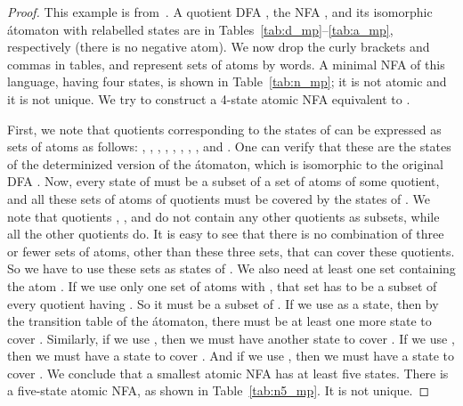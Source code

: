 \documentclass{llncs}
\begin{document}
\begin{proof}
\vskip-0.1cm
This example is from~\cite{MaPo95}. 
A quotient DFA , the NFA , and its isomorphic \'atomaton 
 with relabelled states are  in Tables~\ref{tab:d_mp}--\ref{tab:a_mp}, 
respectively (there is no negative atom). We  now drop the curly brackets and commas in tables, and 
represent sets of atoms by words.
A minimal NFA  of this language, having four states, is shown in 
Table~\ref{tab:n_mp}; it is not atomic and it is not unique. 
We try to construct a 4-state atomic NFA  equivalent to . 

\vskip-0.5cm
\begin{table}[hbt]
\begin{minipage}[b]{0.25\linewidth}
\caption{.}
\label{tab:d_mp}
\begin{center}

\end{center}
\end{minipage}
\hspace{0.05cm}
\begin{minipage}[b]{0.35\linewidth}
\caption{.}
\label{tab:drdr_mp}
\begin{center}

\end{center}
\end{minipage}
\hspace{0.8cm}
\begin{minipage}[b]{0.3\linewidth}
\caption{ .}
\label{tab:a_mp}
\begin{center}

\end{center}
\end{minipage}
\end{table}
\vskip-0.4cm
First, we note that quotients corresponding to the states of  can be expressed 
as sets of atoms as follows:
, , , ,
, , , , and
. One can verify that these are the states of the determinized 
version of the \'atomaton, which is isomorphic to the original DFA . 
Now, every state of  must be a subset of a set of atoms of some quotient, 
and all these sets of atoms of quotients must be covered by the states of .
We note that quotients , , and 
do not contain any other quotients as subsets, while all the other quotients do.
It is easy to see that there is no combination of three or fewer sets of atoms, 
other than these three sets, that can cover these quotients. 
So we have to use these sets as states of . 
We also need at least one set containing the atom . 
If we use only one set of atoms with , that set has to be
a subset of every quotient having . So it must be
a subset of . If we use  as a state, then by the transition 
table of the \'atomaton, there must be at least one more state to cover 
. Similarly, if we use , then we must have another state to cover 
. If we use , then we must have a state to cover 
. And if we use , then we must have a state to cover 
. We conclude that a smallest atomic NFA has at least five states.
There is a five-state atomic NFA, as 
shown in Table~\ref{tab:n5_mp}. It is not unique. 


\end{proof}
\end{document}
